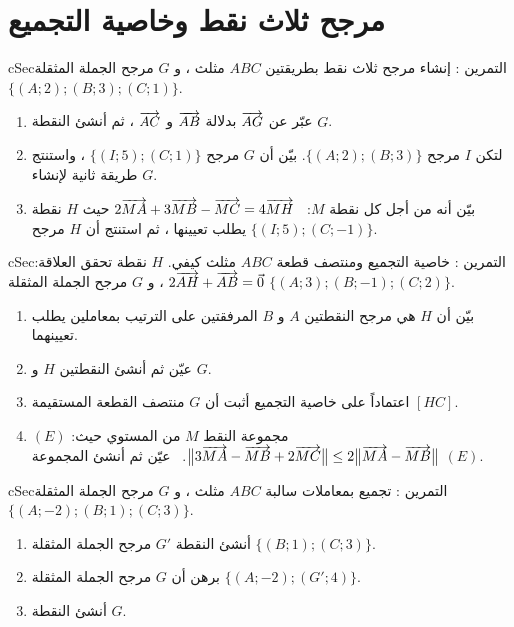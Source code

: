 \documentclass[12pt,a4paper]{article}
\newenvironment{BOX}[2]{\begin{otherlanguage}{english}\begin{arbox}{#1}{#2}}{\end{arbox}\end{otherlanguage}}
\newcounter{exo}
\newenvironment{tamrin}[1]{\stepcounter{exo}\begin{BOX}{cSec}{التمرين \theexo: #1}}{\end{BOX}}
\begin{document}
\section{مرجح ثلاث نقط وخاصية التجميع}
\begin{tamrin}{إنشاء مرجح ثلاث نقط بطريقتين}
$ABC$ مثلث ، و $G$ مرجح الجملة المثقلة $\{(A;2);(B;3);(C;1)\}$.
\begin{enumerate}
\item عبّر عن $\overrightarrow{AG}$ بدلالة $\overrightarrow{AB}$ و $\overrightarrow{AC}$ ، ثم أنشئ النقطة $G$.
\item لتكن $I$ مرجح $\{(A;2);(B;3)\}$. بيّن أن $G$ مرجح $\{(I;5);(C;1)\}$ ، واستنتج طريقة ثانية لإنشاء $G$.
\item بيّن أنه من أجل كل نقطة $M$: \ $2\overrightarrow{MA}+3\overrightarrow{MB}-\overrightarrow{MC}=4\overrightarrow{MH}$ حيث $H$ نقطة يطلب تعيينها ، ثم استنتج أن $H$ مرجح $\{(I;5);(C;-1)\}$.
\end{enumerate}
\end{tamrin}

\begin{tamrin}{خاصية التجميع ومنتصف قطعة}
$ABC$ مثلث كيفي. $H$ نقطة تحقق العلاقة: $2\overrightarrow{AH}+\overrightarrow{AB}=\vec0$ ، و $G$ مرجح الجملة المثقلة $\{(A;3);(B;-1);(C;2)\}$.
\begin{enumerate}
\item بيّن أن $H$ هي مرجح النقطتين $A$ و $B$ المرفقتين على الترتيب بمعاملين يطلب تعيينهما.
\item عيّن ثم أنشئ النقطتين $H$ و $G$.
\item اعتماداً على خاصية التجميع أثبت أن $G$ منتصف القطعة المستقيمة $[HC]$.
\item $(E)$ مجموعة النقط $M$ من المستوي حيث: $\big\|3\overrightarrow{MA}-\overrightarrow{MB}+2\overrightarrow{MC}\big\|\le2\big\|\overrightarrow{MA}-\overrightarrow{MB}\big\|$. \ عيّن ثم أنشئ المجموعة $(E)$.
\end{enumerate}
\end{tamrin}

\begin{tamrin}{تجميع بمعاملات سالبة}
$ABC$ مثلث ، و $G$ مرجح الجملة المثقلة $\{(A;-2);(B;1);(C;3)\}$.
\begin{enumerate}
\item أنشئ النقطة $G'$ مرجح الجملة المثقلة $\{(B;1);(C;3)\}$.
\item برهن أن $G$ مرجح الجملة المثقلة $\{(A;-2);(G';4)\}$.
\item أنشئ النقطة $G$.
\end{enumerate}
\end{tamrin}
\end{document}
